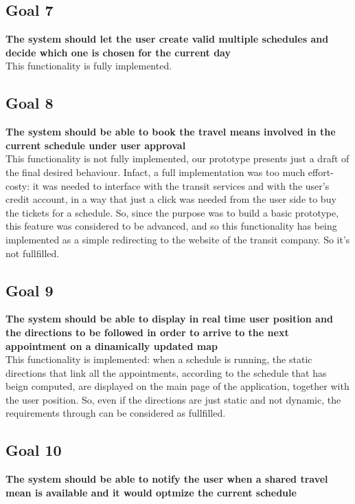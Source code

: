 \subsection{Goal 7} \label{subsect:gScheduleSelection}
\textbf{The system should let the user create valid multiple schedules and decide which one is chosen for the current day}\\

This functionality is fully implemented.

\subsection{Goal 8} \label{subsect:gScheduleSelection}
\textbf{The system should be able to book the travel means involved in the current schedule under user approval}\\

This functionality is not fully implemented, our prototype presents just a draft of the final desired behaviour. Infact, a full implementation was too much effort-costy: it was needed to interface with the transit services and with the user's credit account, in a way that just a click was needed from the user side to buy the tickets for a schedule. So, since the purpose was to build a basic prototype, this feature was considered to be advanced, and so this functionality has being implemented as a simple redirecting to the website of the transit company. So  it's not fullfilled.

\subsection{Goal 9} \label{subsect:gDirections}
\textbf{The system should be able to display in real time user position and the directions to be followed in order to arrive to the next appointment on a dinamically updated map}\\

This functionality is implemented: when a schedule is running, the static directions that link all the appointments, according to the schedule that has beign computed, are displayed on the main page of the application, together with the user position. So, even if the directions are just static and not dynamic, the requirements  through  can be considered as fullfilled.

\subsection{Goal 10} \label{subsect:gSharedTMNotifications}
\textbf{The system should be able to notify the user when a shared travel mean is available and it would optmize the current schedule}\\


